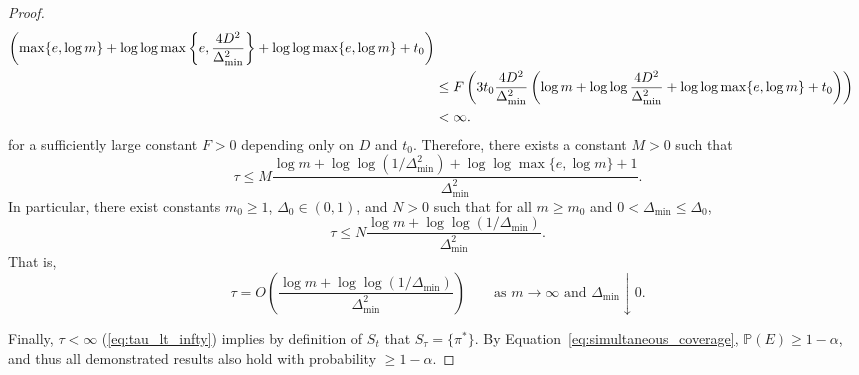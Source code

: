 \documentclass[11pt]{article}
\newcommand{\PP}{\mathbb{P}}
\begin{document}
\begin{proof}
\begin{align}
\left(
\max\{e, \log m\}
+ \log \log \max\left\{e, \frac{4D^2}{\Delta_{\min}^2}\right\}
+ \log \log \max\{e, \log m\}
+ t_0
\right) \notag\\
&\le F\left(
3t_0\frac{4D^2}{\Delta_{\min}^2}
\left(
\log m
+ \log \log \frac{4D^2}{\Delta_{\min}^2}
+ \log \log \max\{e, \log m\}
+ t_0
\right)
\right) \notag\\
&< \infty.
\label{eq:tau_lt_infty}
\end{align}
for a sufficiently large constant $F>0$ depending only on $D$ and $t_0$. Therefore, there exists a constant $M>0$ such that
\[
\tau
\le
M
\frac{
\log m
+ \log \log \left(1/\Delta_{\min}^2\right)
+ \log \log \max\{e, \log m\}
+ 1
}{\Delta_{\min}^2}.
\]
In particular, there exist constants \(m_0 \ge 1\), \(\Delta_0 \in (0,1)\), and \(N>0\) such that for all \(m \ge m_0\) and \(0<\Delta_{\min}\le \Delta_0\),
\[
\tau \le N \frac{\log m + \log\log(1/\Delta_{\min})}{\Delta_{\min}^2}.
\]
That is,
\[
\tau = O\!\left(\frac{\log m + \log\log(1/\Delta_{\min})}{\Delta_{\min}^2}\right)
\qquad \text{as } m\to\infty \text{ and } \Delta_{\min}\downarrow 0.
\]

\noindent Finally, $\tau < \infty$ (\ref{eq:tau_lt_infty}) implies by definition of $S_t$ that $S_\tau = \{\pi^*\}$. By Equation~\ref{eq:simultaneous_coverage}, $\PP(E) \ge 1-\alpha$, and thus all demonstrated results also hold with probability $\ge 1-\alpha$.
\end{proof}


\end{document}
